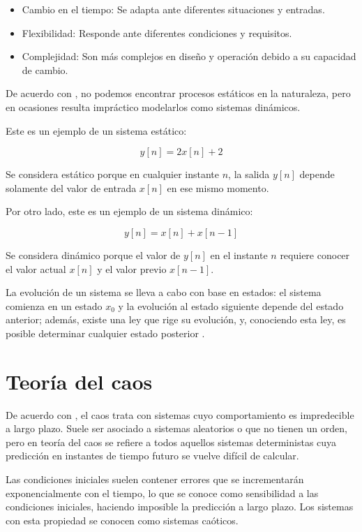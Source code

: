 \begin{itemize}
	\item Cambio en el tiempo: Se adapta ante diferentes situaciones y entradas.
	\item Flexibilidad: Responde ante diferentes condiciones y requisitos.
	\item Complejidad: Son más complejos en diseño y operación debido a su capacidad de cambio.
\end{itemize}

De acuerdo con \cite{Cordero2025_dinamico}, no podemos encontrar procesos estáticos en la naturaleza, pero en ocasiones resulta impráctico modelarlos como sistemas dinámicos.

Este es un ejemplo de un sistema estático:

\begin{equation*}
	y[n] = 2x[n] + 2
\end{equation*}

Se considera estático porque en cualquier instante $n$, la salida $y[n]$ depende solamente del valor de entrada $x[n]$ en ese mismo momento.

Por otro lado, este es un ejemplo de un sistema dinámico:

\begin{equation*}
	y[n] = x[n] + x[n-1]
\end{equation*}

Se considera dinámico porque el valor de $y[n]$ en el instante $n$ requiere conocer el valor actual $x[n]$ y el valor previo $x[n-1]$.

La evolución de un sistema se lleva a cabo con base en estados: el sistema comienza en un estado $x_0$ y la evolución al estado siguiente depende del estado anterior; además, existe una ley que rige su evolución, y, conociendo esta ley, es posible determinar cualquier estado posterior \cite{Alberto2021_dinamico}.

\section{Teoría del caos}

De acuerdo con \cite{Simon2025_caos}, el caos trata con sistemas cuyo comportamiento es impredecible a largo plazo. Suele ser asociado a sistemas aleatorios o que no tienen un orden, pero en teoría del caos se refiere a todos aquellos sistemas deterministas cuya predicción en instantes de tiempo futuro se vuelve difícil de calcular. 

Las condiciones iniciales suelen contener errores que se incrementarán exponencialmente con el tiempo, lo que se conoce como sensibilidad a las condiciones iniciales, haciendo imposible la predicción a largo plazo. Los sistemas con esta propiedad se conocen como sistemas caóticos.

